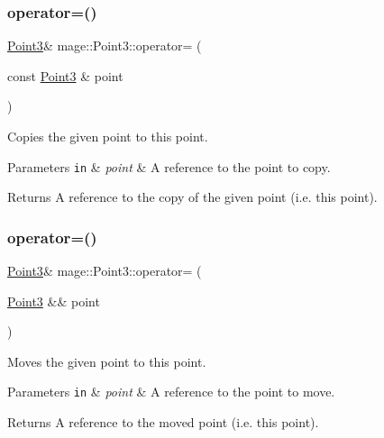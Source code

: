 \subsubsection{\texorpdfstring{operator=()}{operator=()}\hspace{0.1cm}{\footnotesize\ttfamily [1/2]}}
{\footnotesize\ttfamily \hyperlink{structmage_1_1_point3}{Point3}\& mage\+::\+Point3\+::operator= (\begin{DoxyParamCaption}\item[{const \hyperlink{structmage_1_1_point3}{Point3} \&}]{point }\end{DoxyParamCaption})\hspace{0.3cm}{\ttfamily [default]}}

Copies the given point to this point.


\begin{DoxyParams}[1]{Parameters}
\mbox{\tt in}  & {\em point} & A reference to the point to copy. \\
\hline
\end{DoxyParams}
\begin{DoxyReturn}{Returns}
A reference to the copy of the given point (i.\+e. this point). 
\end{DoxyReturn}
\hypertarget{structmage_1_1_point3_ab3a12f78a196535f25269e1288b10a06}{}\label{structmage_1_1_point3_ab3a12f78a196535f25269e1288b10a06} 
\subsubsection{\texorpdfstring{operator=()}{operator=()}\hspace{0.1cm}{\footnotesize\ttfamily [2/2]}}
{\footnotesize\ttfamily \hyperlink{structmage_1_1_point3}{Point3}\& mage\+::\+Point3\+::operator= (\begin{DoxyParamCaption}\item[{\hyperlink{structmage_1_1_point3}{Point3} \&\&}]{point }\end{DoxyParamCaption})\hspace{0.3cm}{\ttfamily [default]}}

Moves the given point to this point.


\begin{DoxyParams}[1]{Parameters}
\mbox{\tt in}  & {\em point} & A reference to the point to move. \\
\hline
\end{DoxyParams}
\begin{DoxyReturn}{Returns}
A reference to the moved point (i.\+e. this point). 
\end{DoxyReturn}
